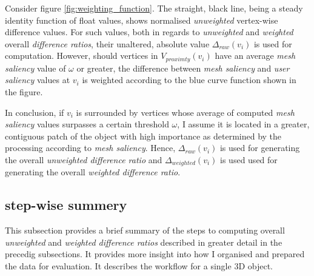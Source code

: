 Consider figure \ref{fig:weighting_function}. The straight, black line, being a steady identity function of float values, shows normalised \textit{unweighted} vertex-wise difference values. For such values, both in regards to \textit{unweighted} and \textit{weighted} overall \textit{difference ratios}, their unaltered, absolute value $\Delta_{raw}(v_i)$ is used for computation. However, should vertices in $V_{proximty}(v_i)$ have an average \textit{mesh saliency} value of $\omega$ or greater, the difference between \textit{mesh saliency} and \textit{user saliency} values at $v_i$ is weighted according to the blue curve function shown in the figure.

In conclusion, if $v_i$ is surrounded by vertices whose average of computed \textit{mesh saliency} values surpasses a certain threshold $\omega$, I assume it is located in a greater, contiguous patch of the object with high importance as determined by the processing according to \textit{mesh saliency}. Hence, $\Delta_{raw}(v_i)$ is used for generating the overall \textit{unweighted difference ratio} and $\Delta_{weighted}(v_i)$ is used used for generating the overall \textit{weighted difference ratio}.

		\subsection{step-wise summery}
		\label{sec:ste_wise_summery}
This subsection provides a brief summary of the steps to computing overall \textit{unweighted} and \textit{weighted difference ratios} described in greater detail in the precedig subsections. It provides more insight into how I organised and prepared the data for evaluation. It describes the workflow for a single 3D object.

